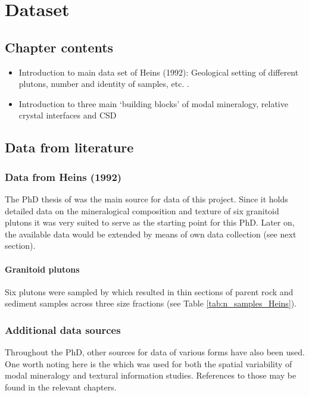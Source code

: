 \chapter{Dataset}\label{ch:dataset}

\section{Chapter contents}
\begin{itemize}
    \item Introduction to main data set of Heins (1992): Geological setting of different plutons, number and identity of samples, etc. . %
    \item Introduction to three main ‘building blocks’ of modal mineralogy, relative crystal interfaces and CSD
\end{itemize}

\section{Data from literature}
    \subsection{Data from Heins (1992)}
    The PhD thesis of \Textcite{Heins_1992} was the main source for data of this project. %
    Since it holds detailed data on the mineralogical composition and texture of six granitoid plutons it was very suited to serve as the starting point for this PhD. %
    Later on, the available data would be extended by means of own data collection (see next section). %

        \subsubsection{Granitoid plutons}
        Six plutons were sampled by \Textcite{Heins_1992} which resulted in  thin sections of parent rock and  sediment samples across three size fractions (see Table \ref{tab:n_samples_Heins}). %

            

    \subsection{Additional data sources}
    Throughout the PhD, other sources for data of various forms have also been used. %
    One worth noting here is the \Textcite{Vistelius_et_al_1983} which was used for both the spatial variability of modal mineralogy and textural information studies. %
    References to those may be found in the relevant chapters. %

